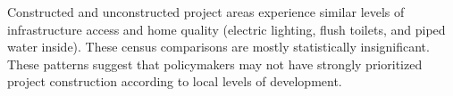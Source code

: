 \documentclass[12pt]{article}
\newcommand{\rv}{}
\begin{document}
\rv{Constructed and unconstructed project areas experience similar levels of infrastructure access and home quality (electric lighting, flush toilets, and piped water inside).  These census comparisons are mostly statistically insignificant.  These patterns suggest that policymakers may not have strongly prioritized project construction according to local levels of development.}








% 
% 
% 
\end{document}

